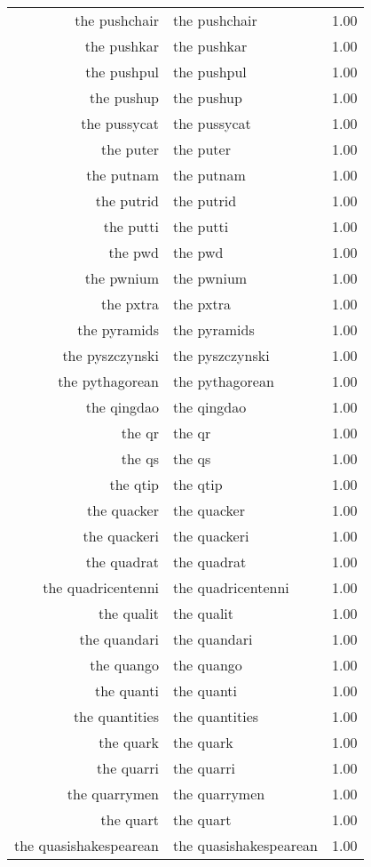 \begin{table}[ht]
\begin{tabular}{rlr}
  the pushchair & the pushchair & 1.00 \\ 
  the pushkar & the pushkar & 1.00 \\ 
  the pushpul & the pushpul & 1.00 \\ 
  the pushup & the pushup & 1.00 \\ 
  the pussycat & the pussycat & 1.00 \\ 
  the puter & the puter & 1.00 \\ 
  the putnam & the putnam & 1.00 \\ 
  the putrid & the putrid & 1.00 \\ 
  the putti & the putti & 1.00 \\ 
  the pwd & the pwd & 1.00 \\ 
  the pwnium & the pwnium & 1.00 \\ 
  the pxtra & the pxtra & 1.00 \\ 
  the pyramids & the pyramids & 1.00 \\ 
  the pyszczynski & the pyszczynski & 1.00 \\ 
  the pythagorean & the pythagorean & 1.00 \\ 
  the qingdao & the qingdao & 1.00 \\ 
  the qr & the qr & 1.00 \\ 
  the qs & the qs & 1.00 \\ 
  the qtip & the qtip & 1.00 \\ 
  the quacker & the quacker & 1.00 \\ 
  the quackeri & the quackeri & 1.00 \\ 
  the quadrat & the quadrat & 1.00 \\ 
  the quadricentenni & the quadricentenni & 1.00 \\ 
  the qualit & the qualit & 1.00 \\ 
  the quandari & the quandari & 1.00 \\ 
  the quango & the quango & 1.00 \\ 
  the quanti & the quanti & 1.00 \\ 
  the quantities & the quantities & 1.00 \\ 
  the quark & the quark & 1.00 \\ 
  the quarri & the quarri & 1.00 \\ 
  the quarrymen & the quarrymen & 1.00 \\ 
  the quart & the quart & 1.00 \\ 
  the quasishakespearean & the quasishakespearean & 1.00 \\ 

\end{tabular}
\end{table}
